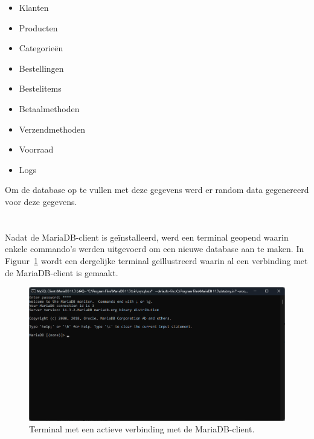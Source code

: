 \begin{itemize}
    \item Klanten
    \item Producten
    \item Categorieën
    \item Bestellingen
    \item Bestelitems
    \item Betaalmethoden
    \item Verzendmethoden
    \item Voorraad
    \item Logs
\end{itemize}
Om de database op te vullen met deze gegevens werd er random data gegenereerd voor deze gegevens.

\newpage

\section{}%
\label{sec:test-mariadb}

\subsection{}%
\label{subsec:creating-mariadb}

Nadat de MariaDB-client is geïnstalleerd, werd een terminal geopend waarin enkele commando's werden uitgevoerd om een nieuwe database aan te maken. In Figuur~\ref{fig:mariadbconnection} wordt een dergelijke terminal geïllustreerd waarin al een verbinding met de MariaDB-client is gemaakt.

\begin{figure}[H]
    \centering
    \includegraphics[width=\linewidth]{graphics/mariadbconnection}
    \caption[Terminal met een actieve verbinding met de MariaDB-client.]{Terminal met een actieve verbinding met de MariaDB-client.}
    \label{fig:mariadbconnection}
\end{figure}

